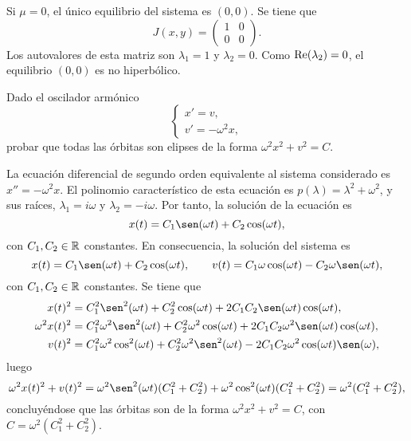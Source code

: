 \documentclass[11pt]{report}
\begin{document}
\begin{solution}
\begin{itemize}
    \end{itemize}
    Si $\mu = 0$, el único equilibrio del sistema es $(0,0)$. Se tiene que
    \[J(x,y) = \left(\begin{array}{cc}
        1 & 0 \\
        0 & 0
    \end{array}\right).\]
    Los autovalores de esta matriz son $\lambda_1 = 1$ y $\lambda_2 = 0$. Como $\textup{Re}(\lambda_2) = 0$, el equilibrio $(0,0)$ es no hiperbólico.
\end{solution}

\begin{exercise}
    Dado el oscilador armónico
    \[
        \begin{cases}
            x' = v, \\
            v' = -\omega^2x,
        \end{cases}
    \]
    probar que todas las órbitas son elipses de la forma $\omega^2x^2+v^2 = C$.
\end{exercise}

\begin{solution}
    La ecuación diferencial de segundo orden equivalente al sistema considerado es $x'' = -\omega^2x$. El polinomio característico de esta ecuación es $p(\lambda) = \lambda^2+\omega^2$, y sus raíces, $\lambda_1 = i\omega$ y $\lambda_2 = -i\omega$. Por tanto, la solución de la ecuación es
    \[x(t) = C_1\sen(\omega t) + C_2\cos(\omega t),\]
    con $C_1,C_2\in\mathbb R$ constantes. En consecuencia, la solución del sistema es
    \[x(t) = C_1\sen(\omega t) + C_2\cos(\omega t), \qquad v(t) = C_1\omega\cos(\omega t)-C_2\omega\sen(\omega t),\]
    con $C_1,C_2\in\mathbb R$ constantes. Se tiene que
    \begin{align*}
        x(t)^2 &= C_1^2\sen^2(\omega t)+C_2^2\cos(\omega t)+2C_1C_2\sen(\omega t)\cos(\omega t), \\
        \omega^2x(t)^2 &= C_1^2\omega^2\sen^2(\omega t)+C_2^2\omega^2\cos(\omega t)+2C_1C_2\omega^2\sen(\omega t)\cos(\omega t), \\
        v(t)^2 &= C_1^2\omega^2\cos^2(\omega t) + C_2^2\omega^2\sen^2(\omega t) -2C_1C_2\omega^2\cos(\omega t)\sen(\omega),
    \end{align*}
    luego
    \[\omega^2x(t)^2+v(t)^2 = \omega^2\sen^2(\omega t)(C_1^2+C_2^2) + \omega^2\cos^2(\omega t)(C_1^2+C_2^2) = \omega^2(C_1^2+C_2^2),\]
    concluyéndose que las órbitas son de la forma $\omega^2x^2+v^2=C$, con $C = \omega^2(C_1^2+C_2^2)$.
\end{solution}
\end{document}
